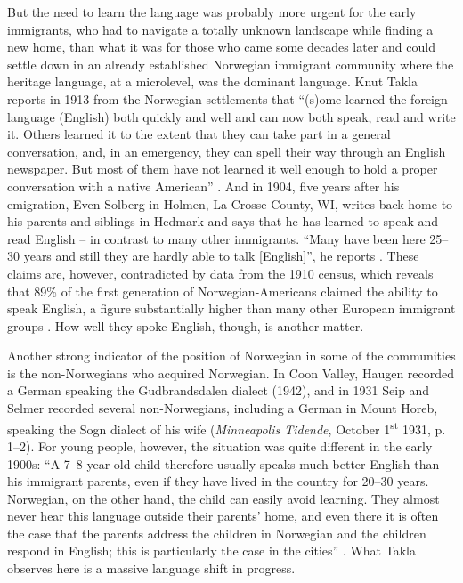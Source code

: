 \documentclass[output=paper]{langscibook}
\begin{document}
But the need to learn the language was probably more urgent for the early immigrants, who had to navigate a totally unknown landscape while finding a new home, than what it was for those who came some decades later and could settle down in an already established Norwegian immigrant community where the heritage language, at a microlevel, was the dominant language. Knut Takla reports in 1913 from the Norwegian settlements that “(s)ome learned the foreign language (English) both quickly and well and can now both speak, read and write it. Others learned it to the extent that they can take part in a general conversation, and, in an emergency, they can spell their way through an English newspaper. But most of them have not learned it well enough to hold a proper conversation with a native American” \citep[288, my translation]{Takla1913}. And in 1904, five years after his emigration, Even Solberg in Holmen, La Crosse County, WI, writes back home to his parents and siblings in Hedmark and says that he has learned to speak and read English – in contrast to many other immigrants. “Many have been here 25--30 years and still they are hardly able to talk [English]”, he reports \citep[444, my translation]{Øverland2010}. These claims are, however, contradicted by data from the 1910 census, which reveals that 89\% of the first generation of Norwegian\hyp Americans claimed the ability to speak English, a figure substantially higher than many other European immigrant groups \citep[385]{Labov1998}. How well they spoke English, though, is another matter. 

Another strong indicator of the position of Norwegian in some of the communities is the non-Norwegians who acquired Norwegian. In Coon Valley, Haugen recorded a German speaking the Gudbrandsdalen dialect (1942), and in 1931 Seip and Selmer recorded several non-Norwegians, including a German in Mount Horeb, speaking the Sogn dialect of his wife (\textit{Minneapolis Tidende}, October 1\textsuperscript{st} 1931, p. 1--2). For young people, however, the situation was quite different in the early 1900s: “A 7–8-year-old child therefore usually speaks much better English than his immigrant parents, even if they have lived in the country for 20--30 years. Norwegian, on the other hand, the child can easily avoid learning. They almost never hear this language outside their parents' home, and even there it is often the case that the parents address the children in Norwegian and the children respond in English; this is particularly the case in the cities” \citep[289--290, my translation]{Takla1913}. What Takla observes here is a massive language shift in progress. 
\end{document}
